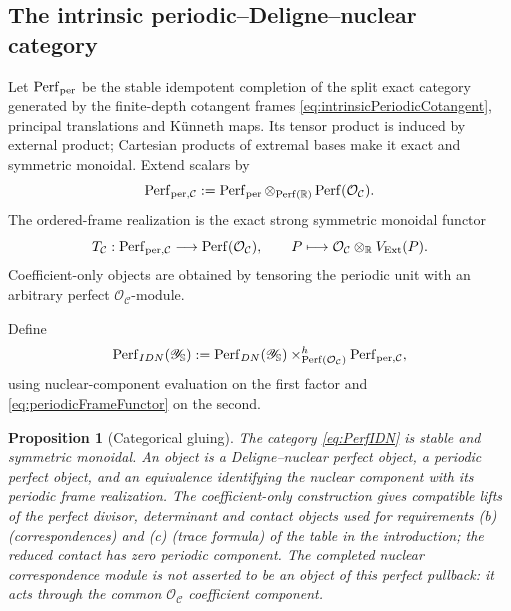 \documentclass[11pt]{amsart}
\newtheorem{proposition}[theorem]{Proposition}
\theoremstyle{definition}
\theoremstyle{remark}
\newcommand{\R}{\mathbb R}
\begin{document}
\subsection{The intrinsic periodic--Deligne--nuclear category}

Let $\operatorname{Perf}_{\rm per}$ be the stable idempotent completion of
the split exact category generated by the finite-depth cotangent frames
\eqref{eq:intrinsicPeriodicCotangent}, principal translations and K\"unneth
maps.  Its tensor product is induced by external product; Cartesian
products of extremal bases make it exact and symmetric monoidal.  Extend
scalars by
\begin{equation}\label{eq:periodicNuclearCategory}
 \operatorname{Perf}_{\rm per,\mathcal C}
 :=\operatorname{Perf}_{\rm per}
   \otimes_{\operatorname{Perf}(\R)}
   \operatorname{Perf}(\mathcal O_{\mathcal C}).
\end{equation}
The ordered-frame realization is the exact strong symmetric monoidal
functor
\begin{equation}\label{eq:periodicFrameFunctor}
 T_{\mathcal C}:\operatorname{Perf}_{\rm per,\mathcal C}
 \longrightarrow\operatorname{Perf}(\mathcal O_{\mathcal C}),
 \qquad
 P\longmapsto\mathcal O_{\mathcal C}\otimes_\R V_{\rm Ext}(P).
\end{equation}
Coefficient-only objects are obtained by tensoring the periodic unit with
an arbitrary perfect $\mathcal O_{\mathcal C}$-module.

Define
\begin{equation}\label{eq:PerfIDN}
 \operatorname{Perf}_{IDN}(\mathscr Y_{\mathbb S})
 :=\operatorname{Perf}_{DN}(\mathscr Y_{\mathbb S})
 \times^h_{\operatorname{Perf}(\mathcal O_{\mathcal C})}
 \operatorname{Perf}_{\rm per,\mathcal C},
\end{equation}
using nuclear-component evaluation on the first factor and
\eqref{eq:periodicFrameFunctor} on the second.

\begin{proposition}[Categorical gluing]
\label{prop:intrinsicCategoricalGluing}
The category \eqref{eq:PerfIDN} is stable and symmetric monoidal.  An object
is a Deligne--nuclear perfect object, a periodic perfect object, and an
equivalence identifying the nuclear component with its periodic frame
realization.  The coefficient-only construction gives compatible lifts of
the perfect divisor, determinant and contact objects used for requirements
\textup{(b)} (correspondences) and \textup{(c)} (trace formula) of the table
in the introduction; the reduced contact has zero periodic
component.  The completed nuclear correspondence module is not asserted to
be an object of this perfect pullback: it acts through the common
$\mathcal O_{\mathcal C}$ coefficient component.
\end{proposition}
\end{document}
